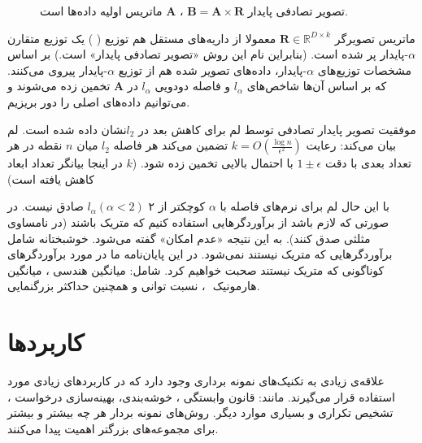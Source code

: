 \begin{figure}[h]
\centering
\begin{latin}
\end{latin}
\caption{
تصویر تصادفی پایدار 
$\mathbf{B} = \mathbf{A} \times \mathbf{R}$
،
$\mathbf{A}$
ماتریس اولیه داده‌ها است.
}
\label{fig:matrixmulti}
\end{figure}

ماتریس تصویرگر 
$\mathbf{R} \in \mathbb{R}^{D \times k}$
معمولا از داریه‌های مستقل هم توزیع (
) یک توزیع متقارن $\alpha$-پایدار پر شده است.
\cite{litez171}
(بنابراین نام این روش «تصویر تصادفی پایدار» است.)
بر اساس مشخصات توزیع‌های $\alpha$-پایدار، داده‌های تصویر شده هم از توزیع $\alpha$-پایدار پیروی می‌کنند. که بر اساس آن‌ها شاخص‌های $l_\alpha$ و فاصله دودویی $l_\alpha$ در $\mathbf{A}$ تخمین زده می‌شوند و می‌توانیم داده‌های اصلی را دور بریزیم.

موفقیت تصویر پایدار تصادفی توسط لم 
\cite{litez103}
برای کاهش بعد در $l_2$نشان داده شده است. لم
بیان می‌کند: رعایت
$k = O \left ( \frac{\log n}{\epsilon^2 } \right ) $
تضمین می‌کند هر فاصله $l_2$ میان $n$ نقطه در هر تعداد بعدی با دقت 
$1\pm\epsilon$
 با احتمال بالایی تخمین زده شود. ($k$ در اینجا بیانگر تعداد ابعاد کاهش یافته است)

با این حال لم 
برای نرم‌های فاصله با 
$\alpha$
کوچکتر از ۲ 
$l_\alpha ( \alpha < 2 )$
صادق نیست. در صورتی که لازم باشد از برآوردگرهایی استفاده کنیم که متریک باشند (در نامساوی مثلثی صدق کنند). به این نتیجه «عدم امکان»
 گفته می‌شود.
\cite{litez39, litez109, litez33}
خوشبختانه شامل برآوردگرهایی که متریک نیستند نمی‌شود. در این پایان‌نامه ما در مورد برآوردگرهای کوناگونی که متریک نیستند صحبت خواهیم کرد. شامل: میانگین هندسی
، میانگین هارمونیک
‌
، نسبت توانی
و همچنین حداکثر بزرگنمایی.

\section{کاربردها}
علاقه‌ی زیادی به تکنیک‌های نمونه برداری وجود دارد که در کاربردهای زیادی مورد استفاده قرار می‌گیرند. مانند: قانون وابستگی
\cite{litez30, litez31}
، خوشه‌بندی، بهینه‌سازی درخواست
\cite{litez136, litez44}
، تشخیص تکراری
\cite{litez34, litez28}
و بسیاری موارد دیگر. روش‌های نمونه بردار هر چه بیشتر و بیشتر برای مجموعه‌های بزرگتر اهمیت پیدا می‌کنند.

